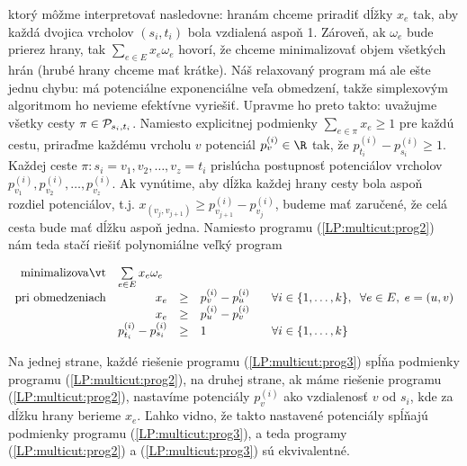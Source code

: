 \noindent
ktorý môžme interpretovať nasledovne: 
hranám chceme priradiť dĺžky $x_e$ tak, aby každá dvojica vrcholov $(s_i,t_i)$ bola vzdialená aspoň 1.
Zároveň, ak $\omega_e$ bude prierez hrany, tak $\sum_{e\in E}x_e\omega_e$ hovorí, že chceme minimalizovať 
objem všetkých hrán (hrubé hrany chceme mať krátke).
Náš relaxovaný program má ale ešte jednu chybu: má potenciálne exponenciálne veľa obmedzení, takže
simplexovým algoritmom ho nevieme efektívne vyriešiť. Upravme ho preto takto: uvažujme všetky cesty 
$\pi\in{\cal P}_{s_i,t_i}$. Namiesto explicitnej podmienky $\sum_{e\in\pi}x_e\ge1$ pre každú cestu, priraďme každému
vrcholu $v$ potenciál $p_v^{(i)}\in\R$ tak, že $p_{t_i}^{(i)}-p_{s_i}^{(i)}\ge1$. Každej ceste 
$\pi: s_i=v_1,v_2,\ldots,v_z=t_i$
prislúcha postupnosť potenciálov vrcholov $p_{v_1}^{(i)},p_{v_2}^{(i)},\ldots,p_{v_z}^{(i)}$. Ak 
vynútime, aby dĺžka každej hrany cesty bola aspoň rozdiel potenciálov, t.j.
$x_{(v_j,v_{j+1})}\ge p_{v_{j+1}}^{(i)}-p_{v_j}^{(i)}$, budeme mať zaručené, 
že celá cesta bude mať dĺžku aspoň jedna.
Namiesto programu  (\ref{LP:multicut:prog2}) nám teda stačí riešiť polynomiálne veľký program

\begin{equation}
\label{LP:multicut:prog3}
\begin{array}{rrcll}
  {\rm minimalizovať}     & \multicolumn{1}{l}{ \sum\limits_{e\in E}x_e\omega_e}\\
  {\rm pri\ obmedzeniach} & x_e&\ge&p_v^{(i)}-p_u^{(i)}& \;\;\;
                              \forall i\in\{1,\ldots,k\},\;\; \forall e\in E, \;e=(u,v)\\
                          & x_e&\ge&p_u^{(i)}-p_v^{(i)}\\
                          & p_{t_i}^{(i)}-p_{s_i}^{(i)}&\ge&1& \;\;\;
                              \forall i\in\{1,\ldots,k\}\\
\end{array}
\end{equation}

\noindent
Na jednej strane, každé riešenie programu (\ref{LP:multicut:prog3}) spĺňa podmienky programu  (\ref{LP:multicut:prog2}),
na druhej strane, ak máme riešenie programu  (\ref{LP:multicut:prog2}), nastavíme potenciály $p_{v}^{(i)}$ ako
vzdialenosť $v$ od $s_i$, kde za dĺžku hrany berieme $x_e$. Ľahko vidno, že takto nastavené potenciály spĺňajú podmienky
programu  (\ref{LP:multicut:prog3}), a teda programy  (\ref{LP:multicut:prog2}) a  (\ref{LP:multicut:prog3}) sú ekvivalentné.


